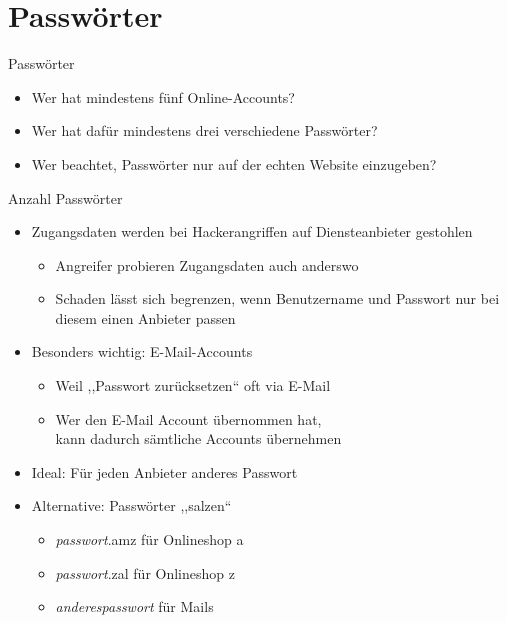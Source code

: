 \section{Passwörter}
\begin{frame}{Passwörter}
  \begin{itemize}
    \item<+->{Wer hat mindestens fünf Online-Accounts?}
    \item<+->{Wer hat dafür mindestens drei verschiedene Passwörter?}
    \item<+->{Wer beachtet, Passwörter nur auf der echten Website einzugeben?}
  \end{itemize}
\end{frame}

\begin{frame}{Anzahl Passwörter}
  \begin{itemize}
    \item Zugangsdaten werden bei Hackerangriffen auf Diensteanbieter gestohlen
    \begin{itemize}
      \item Angreifer probieren Zugangsdaten auch anderswo
      \item Schaden lässt sich begrenzen, wenn Benutzername und Passwort nur bei diesem einen Anbieter passen
    \end{itemize}
    \item Besonders wichtig: E-Mail-Accounts
    \begin{itemize}
      \item Weil ,,Passwort zurücksetzen`` oft via E-Mail
      \item Wer den E-Mail Account übernommen hat,\\ kann dadurch sämtliche Accounts übernehmen
    \end{itemize}
    \item Ideal: Für jeden Anbieter anderes Passwort
    \item Alternative: Passwörter ,,salzen``
    \begin{itemize}
      \item \textit{passwort}.amz für Onlineshop a
      \item \textit{passwort}.zal für Onlineshop z
      \item \textit{anderespasswort} für Mails
    \end{itemize}
  \end{itemize}
\end{frame}

